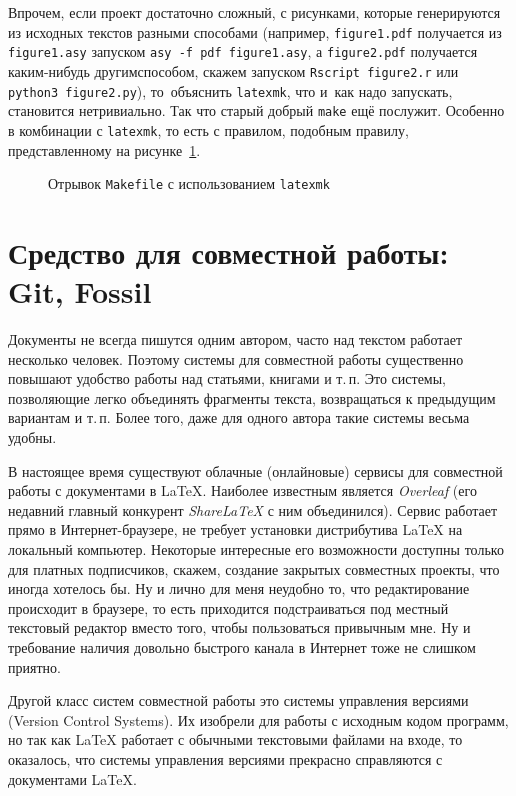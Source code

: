 \documentclass[a4paper,12pt,hyphens]{article}
\newcommand\softname[1]{\textit{#1}}
\newcommand\exe[1]{\texttt{#1}}
\newcommand\file[1]{\texttt{#1}}
\begin{document}
Впрочем, если проект достаточно сложный, с рисунками, которые генерируются
из исходных текстов разными способами (например, \file{figure1.pdf}
получается из \file{figure1.asy} запуском \verb|asy -f pdf figure1.asy|,
а \file{figure2.pdf} получается каким-нибудь другим\break способом, скажем
запуском \verb|Rscript figure2.r| или \verb|python3 figure2.py|), то~объяснить \exe{latexmk}, что и~как
надо запускать, становится нетривиально. Так что старый добрый \exe{make}
ещё послужит. Особенно в комбинации с \exe{latexmk}, то есть с правилом,
подобным правилу, представленному на рисунке~\ref{latexmk3}.
\begin{figure}[tp]
\caption{Отрывок \file{Makefile} с использованием \exe{latexmk}}\label{latexmk3}
\end{figure}

\section{Средство для совместной работы: Git, Fossil}
Документы не всегда пишутся одним автором, часто над текстом работает несколько
человек. Поэтому системы для совместной работы существенно повышают удобство работы
над статьями, книгами и т.\,п. Это системы, позволяющие легко объединять фрагменты
текста, возвращаться к предыдущим вариантам и т.\,п. Более того, даже для одного автора
такие системы весьма удобны.

В настоящее время существуют облачные (онлайновые) сервисы для совместной работы с
документами в \LaTeX{}. Наиболее известным является \softname{Overleaf} \parencite{site-overleaf}
(его недавний главный конкурент \softname{ShareLaTeX} \parencite{site-sharelatex} с ним
объединился). Сервис работает прямо в Интернет-браузере, не требует установки дистрибутива
\LaTeX{} на локальный компьютер. Некоторые интересные его возможности доступны только
для платных подписчиков, скажем, создание закрытых совместных проекты, что иногда
хотелось бы. Ну и лично для меня неудобно то, что редактирование происходит в
браузере, то есть приходится подстраиваться под местный текстовый редактор
вместо того, чтобы пользоваться привычным мне. Ну и требование наличия довольно
быстрого канала в Интернет тоже не слишком приятно.

Другой класс систем совместной работы это системы управления версиями (Version
Control Systems). Их изобрели для работы с исходным кодом программ, но так как
\LaTeX{} работает с обычными текстовыми файлами на входе, то оказалось, что
системы управления версиями прекрасно справляются с документами \LaTeX{}.
\end{document}
